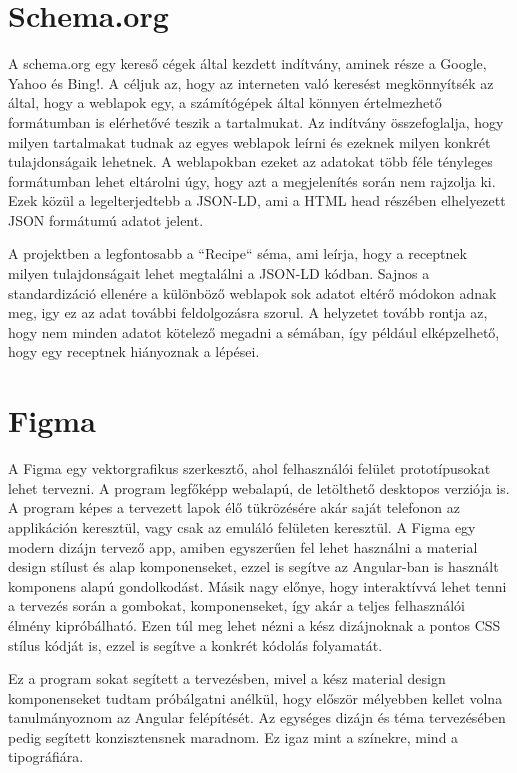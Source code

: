 \documentclass[12pt]{report}
\theoremstyle{definition}
\begin{document}
\section{Schema.org}
\label{shemaorg}

A schema.org egy kereső cégek által kezdett indítvány, aminek része a Google, Yahoo és Bing!. 
A céljuk az, hogy az interneten való keresést megkönnyítsék az által, hogy a weblapok egy, a számítógépek által könnyen értelmezhető formátumban is elérhetővé teszik a tartalmukat. 
Az indítvány összefoglalja, hogy milyen tartalmakat tudnak az egyes weblapok leírni és ezeknek milyen konkrét tulajdonságaik lehetnek. 
A weblapokban ezeket az adatokat több féle tényleges formátumban lehet eltárolni úgy, hogy azt a megjelenítés során nem rajzolja ki. Ezek közül a legelterjedtebb a JSON-LD, ami a HTML head részében elhelyezett JSON formátumú adatot jelent.

A projektben a legfontosabb a “Recipe“ séma, ami leírja, hogy a receptnek milyen tulajdonságait lehet megtalálni a JSON-LD kódban. 
Sajnos a standardizáció ellenére a különböző weblapok sok adatot eltérő módokon adnak meg, igy ez az adat további feldolgozásra szorul. 
A helyzetet tovább rontja az, hogy nem minden adatot kötelező megadni a sémában, így például elképzelhető, hogy egy receptnek hiányoznak a lépései. 


\section{Figma}
A Figma egy vektorgrafikus szerkesztő, ahol felhasználói felület prototípusokat lehet tervezni. A program legfőképp webalapú, de letölthető desktopos verziója is. 
A program képes a tervezett lapok élő tükrözésére akár saját telefonon az applikáción keresztül, vagy csak az emuláló felületen keresztül. 
A Figma egy modern dizájn tervező app, amiben egyszerűen fel lehet használni a material design stílust és alap komponenseket, ezzel is segítve az Angular-ban is használt komponens alapú gondolkodást. Másik nagy előnye, hogy interaktívvá lehet tenni a tervezés során a gombokat, komponenseket, így akár a teljes felhasználói élmény kipróbálható. Ezen túl meg lehet nézni a kész dizájnoknak  a pontos CSS stílus kódját is, ezzel is segítve a konkrét kódolás folyamatát.

Ez a program sokat segített a tervezésben, mivel a kész material design komponenseket tudtam próbálgatni anélkül, hogy először mélyebben kellet volna tanulmányoznom az Angular felépítését. 
Az egységes dizájn és téma tervezésében pedig segített konzisztensnek maradnom. Ez igaz mint a színekre, mind a tipográfiára.
\end{document}
